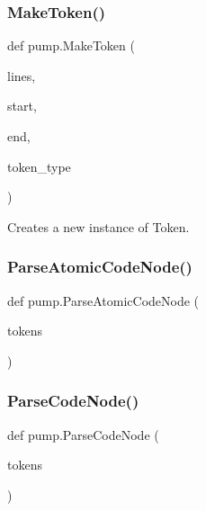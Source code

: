 \mbox{\label{namespacepump_af96d60dc97b160f3a18e63857aabeef7}} 
\subsubsection{\texorpdfstring{MakeToken()}{MakeToken()}}
{\footnotesize\ttfamily def pump.\+Make\+Token (\begin{DoxyParamCaption}\item[{}]{lines,  }\item[{}]{start,  }\item[{}]{end,  }\item[{}]{token\+\_\+type }\end{DoxyParamCaption})}

\begin{DoxyVerb}Creates a new instance of Token.\end{DoxyVerb}
 \mbox{\label{namespacepump_a5532710f334f026f80fc485decf5078e}} 
\subsubsection{\texorpdfstring{ParseAtomicCodeNode()}{ParseAtomicCodeNode()}}
{\footnotesize\ttfamily def pump.\+Parse\+Atomic\+Code\+Node (\begin{DoxyParamCaption}\item[{}]{tokens }\end{DoxyParamCaption})}

\mbox{\label{namespacepump_aabbc064b8664abbe05618b3a0f5a6c38}} 
\subsubsection{\texorpdfstring{ParseCodeNode()}{ParseCodeNode()}}
{\footnotesize\ttfamily def pump.\+Parse\+Code\+Node (\begin{DoxyParamCaption}\item[{}]{tokens }\end{DoxyParamCaption})}

\mbox{\label{namespacepump_ae40493525a993e81929c6905e329a406}} 
